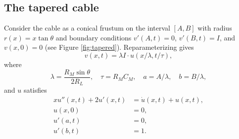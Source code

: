 \documentclass[parskip=half]{scrartcl}
\theoremstyle{nonumberplain}
\begin{document}
\subsection{The tapered cable}

Consider the cable as a conical frustum on the interval $[A, B]$ with radius
$r(x) = x \tan\theta$ and boundary conditions $v'(A, t) = 0$, $v'(B, t) = I$,
and $v(x, 0) = 0$ (see Figure \ref{fig:tapered}). Reparameterizing gives
\begin{equation}
    v(x, t) = \lambda I\cdot u(x/\lambda, t/\tau),
\end{equation}
where
\begin{equation}
    \lambda = \frac{R_M\sin\theta}{2 R_L}, \quad \tau = R_M C_M, \quad a = A/\lambda, \quad b = B/\lambda,
\end{equation}
and $u$ satisfies
\begin{equation}
    \label{eq:conu}
    \begin{aligned}
        x u''(x, t) + 2 u'(x, t) &= \dot u(x, t) + u(x, t),\\
        u(x, 0) &= 0,\\
        u'(a, t) &= 0,\\
        u'(b, t) &= 1.
    \end{aligned}
\end{equation}
\end{document}
